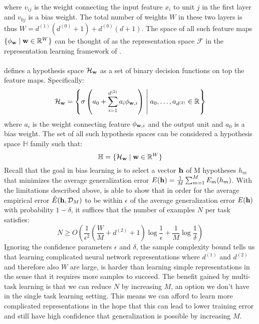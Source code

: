 where $v_{ij}$ is the weight connecting the input feature $x_i$ to unit $j$ in the first layer and $v_{0j}$ is a bias weight. The total number of weights $W$ in these two layers is thus $W = d^{(1)}(d^{(0)} + 1) + d^{(0)}(d + 1)$. The space of all such feature maps $\{\phi_{\mathbf{w}} \mid \mathbf{w} \in \mathbb{R}^W\}$ can be thought of as the representation space $\mathcal{F}$ in the representation learning framework of \citet{baxter1995}.
\\\\
\cite{baxter2000} defines a hypothesis space $\mathcal{H}_{\mathbf{w}}$ as a set of binary decision functions on top the feature maps. Specifically:
$$
\mathcal{H}_{\mathbf{w}} = \left\{ \sigma\left(  a_{0} + \sum\limits_{i=1}^{d^{(2)}} a_i\phi_{\mathbf{w},i}\right) \;\middle| \; a_{0},\dots,a_{d^{(2)}} \in \mathbb{R} \right\}
$$
where $a_i$ is the weight connecting feature $\phi_{\mathbf{w},i}$ and the output unit and $a_0$ is a bias weight. The set of all such hypothesis spaces can be considered a hypothesis space $\mathbb{H}$ family such that:
$$
\mathbb{H} = \{\mathcal{H}_{\mathbf{w}} \mid \mathbf{w} \in \mathbb{R}^W\}
$$
Recall that the goal in bias learning is to select a vector $\mathbf{h}$ of M hypotheses $h_m$ that minimizes the average generalization error $E(\mathbf{h}) = \frac{1}{M}\sum_{m=1}^M E_m(h_m)$. With the limitations described above, \citet{baxter2000} is able to show that in order for the average empirical error $\hat{E}(\mathbf{h}, \mathcal{D}_M)$ to be within $\epsilon$ of the average generalization error $E(\mathbf{h})$ with probability $1 - \delta$, it suffices that the number of examples $N$ per task satisfies:
$$
N \geq O\left( \frac{1}{\epsilon^2}\left( \frac{W}{M} + d^{(2)} + 1\right)\log \frac{1}{\epsilon} + \frac{1}{M}\log\frac{1}{\delta} \right)
$$
Ignoring the confidence parameters $\epsilon$ and $\delta$, the sample complexity bound tells us that learning complicated neural network representations where $d^{(1)}$ and $d^{(2)}$ and therefore also $W$ are large, is harder than learning simple representations in the sense that it requires more samples to succeed. The benefit gained by multi-task learning is that we can reduce $N$ by increasing $M$, an option we don't have in the single task learning setting. This means we can afford to learn more complicated representations in the hope that this can lead to lower training error and still have high confidence that generalization is possible by increasing $M$.